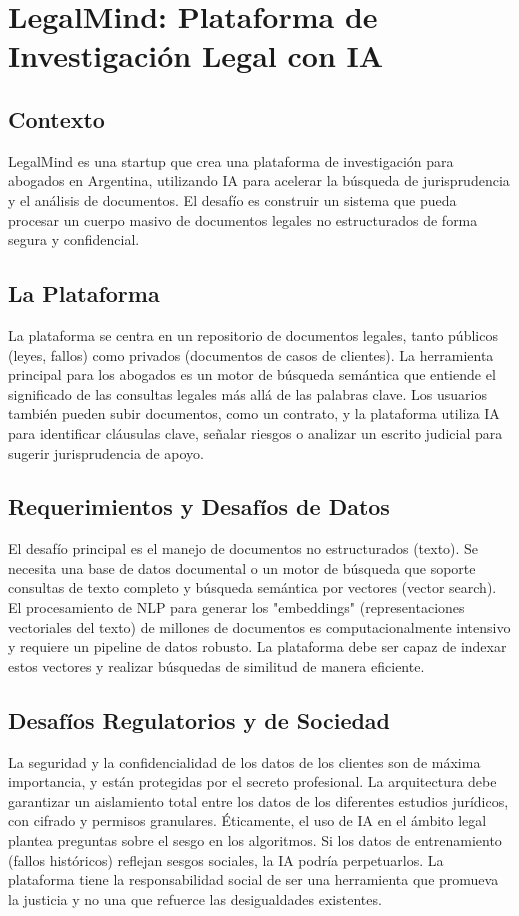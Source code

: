 \documentclass[12pt]{article}
\begin{document}
\newpage

\section{LegalMind: Plataforma de Investigación Legal con IA}

\subsection{Contexto}
LegalMind es una startup que crea una plataforma de investigación para abogados en Argentina, utilizando IA para acelerar la búsqueda de jurisprudencia y el análisis de documentos. El desafío es construir un sistema que pueda procesar un cuerpo masivo de documentos legales no estructurados de forma segura y confidencial.

\subsection{La Plataforma}
La plataforma se centra en un repositorio de documentos legales, tanto públicos (leyes, fallos) como privados (documentos de casos de clientes). La herramienta principal para los abogados es un motor de búsqueda semántica que entiende el significado de las consultas legales más allá de las palabras clave. Los usuarios también pueden subir documentos, como un contrato, y la plataforma utiliza IA para identificar cláusulas clave, señalar riesgos o analizar un escrito judicial para sugerir jurisprudencia de apoyo.

\subsection{Requerimientos y Desafíos de Datos}
El desafío principal es el manejo de documentos no estructurados (texto). Se necesita una base de datos documental o un motor de búsqueda que soporte consultas de texto completo y búsqueda semántica por vectores (vector search). El procesamiento de NLP para generar los "embeddings" (representaciones vectoriales del texto) de millones de documentos es computacionalmente intensivo y requiere un pipeline de datos robusto. La plataforma debe ser capaz de indexar estos vectores y realizar búsquedas de similitud de manera eficiente.

\subsection{Desafíos Regulatorios y de Sociedad}
La seguridad y la confidencialidad de los datos de los clientes son de máxima importancia, y están protegidas por el secreto profesional. La arquitectura debe garantizar un aislamiento total entre los datos de los diferentes estudios jurídicos, con cifrado y permisos granulares. Éticamente, el uso de IA en el ámbito legal plantea preguntas sobre el sesgo en los algoritmos. Si los datos de entrenamiento (fallos históricos) reflejan sesgos sociales, la IA podría perpetuarlos. La plataforma tiene la responsabilidad social de ser una herramienta que promueva la justicia y no una que refuerce las desigualdades existentes.
\end{document}
